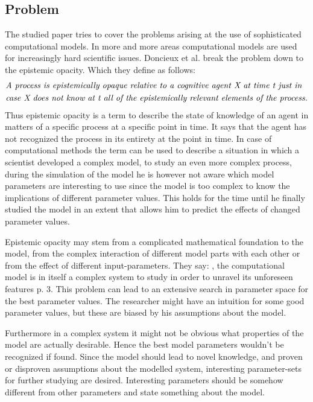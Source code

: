 \documentclass[12pt,twoside]{article}
\theoremstyle{plain}
\theoremstyle{definition}
\theoremstyle{remark}
\begin{document}
\subsection{Problem}
The studied paper \cite{doncieux2015multi} tries to cover the problems arising at the use of sophisticated computational models.
In more and more areas computational models are used for increasingly hard scientific issues.
Doncieux et al. break the problem down to the epistemic opacity. Which they define as follows:
\begin{align*}
	&\text{\textit{A process is epistemically opaque relative to a cognitive agent X at time t just in}}\\
	&\text{\textit{case X does not know at t all of the epistemically relevant elements of the process.}}
\end{align*}
Thus epistemic opacity is a term to describe the state of knowledge of an agent in matters of a specific process at a specific point in time.
It says that the agent has not recognized the process in its entirety at the point in time.
In case of computational methods the term can be used to describe a situation in which a scientist developed a complex model, to study an even more complex process, during the simulation of the model he is however not aware which model parameters are interesting to use since the model is too complex to know the implications of different parameter values. This holds for the time until he finally studied the model in an extent that allows him to predict the effects of changed parameter values.\medskip

Epistemic opacity may stem from a complicated mathematical foundation to the model, from the complex interaction of different model parts with each other or from the effect of different input-parameters.
They say: \glqq[...], the computational model is in itself a complex system to study in order to unravel its unforeseen features\grqq{} \cite{doncieux2015multi} p. 3.
This problem can lead to an extensive search in parameter space for the \glqq best\grqq{} parameter values.
The researcher might have an intuition for some good parameter values, but these are biased by his assumptions about the model. 

Furthermore in a complex system it might not be obvious what properties of the model are actually desirable. Hence the \glqq best\grqq{} model parameters wouldn't be recognized if found.
Since the model should lead to novel knowledge, and proven or disproven assumptions about the modelled system, interesting parameter-sets for further studying are desired. Interesting parameters should be somehow different from other parameters and state something about the model.
\end{document}
